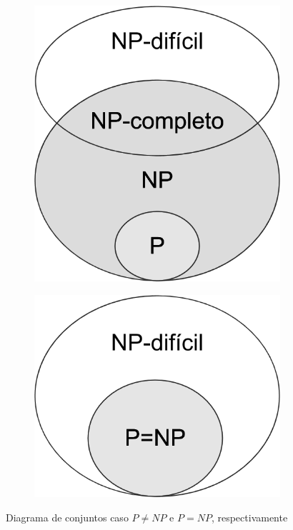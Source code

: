 \documentclass[a4paper,12pt,oneside,onecolumn]{uerj}
\begin{document}
\begin{figure}[!htbp]
\centering
\begin{subfigure}{.5\textwidth}
  \centering
  \includegraphics[scale=0.3]{figures/p_neq_np.png}
\end{subfigure}%
\begin{subfigure}{.5\textwidth}
  \centering
  \includegraphics[scale=0.3]{figures/p_eq_np.png}
\end{subfigure}
\caption{Diagrama de conjuntos caso $P \neq NP$ e $P=NP$, respectivamente}
\label{fig:p_np}
\end{figure}
\end{document}
